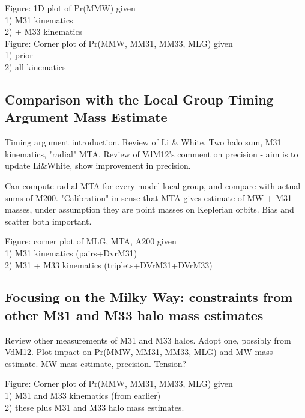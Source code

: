\documentclass[iop,apj]{emulateapj}
\begin{document}
Figure: 1D plot of Pr(MMW) given \\
  1) M31 kinematics\\
  2) + M33 kinematics\\

Figure: Corner plot of Pr(MMW, MM31, MM33, MLG) given\\
   1) prior \\
   2) all kinematics \\


\subsection{Comparison with the Local Group Timing Argument Mass Estimate}
\label{sec:results:TA}

Timing argument introduction. Review of Li \& White. Two halo sum, M31
kinematics, "radial" MTA. Review of VdM12's comment on precision - aim is to
update Li\&White, show improvement in precision.  

Can compute radial MTA for every model local group,  and compare with actual
sums of M200. "Calibration" in sense that MTA gives estimate of MW + M31
masses, under assumption they are point masses on Keplerian orbits. Bias and
scatter both important.

Figure: corner plot of MLG, MTA, A200 given \\
  1) M31 kinematics (pairs+DvrM31)\\
  2) M31 + M33 kinematics (triplets+DVrM31+DVrM33)\\


\subsection{Focusing on the Milky Way: constraints from other M31 and M33 halo mass estimates}
\label{sec:results:MW}

Review other measurements of M31 and M33 halos. Adopt one, possibly from
VdM12. Plot impact on Pr(MMW, MM31, MM33, MLG) and MW mass estimate. MW mass
estimate, precision. Tension?

Figure: Corner plot of Pr(MMW, MM31, MM33, MLG) given\\
   1) M31 and M33 kinematics (from earlier) \\
   2) these plus M31 and M33 halo mass estimates. \\
\end{document}
